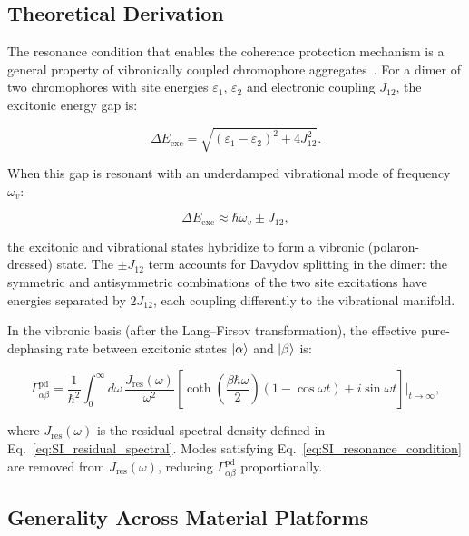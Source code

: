 \documentclass[11pt,a4paper]{article}
\begin{document}
\subsection{Theoretical Derivation}

The resonance condition that enables the coherence protection mechanism is a general property of vibronically coupled chromophore aggregates~\cite{Chin2013,Christensson2012}.
For a dimer of two chromophores with site energies $\varepsilon_1$, $\varepsilon_2$ and electronic coupling $J_{12}$, the excitonic energy gap is:

\begin{equation}
\Delta E_{\mathrm{exc}} = \sqrt{(\varepsilon_1 - \varepsilon_2)^2 + 4J_{12}^2}.
\label{eq:SI_exciton_gap}
\end{equation}

When this gap is resonant with an underdamped vibrational mode of frequency $\omega_v$:

\begin{equation}
\Delta E_{\mathrm{exc}} \approx \hbar\omega_v \pm J_{12},
\label{eq:SI_resonance_condition}
\end{equation}

the excitonic and vibrational states hybridize to form a vibronic (polaron-dressed) state.
The $\pm J_{12}$ term accounts for Davydov splitting in the dimer: the symmetric and antisymmetric combinations of the two site excitations have energies separated by $2J_{12}$, each coupling differently to the vibrational manifold.

In the vibronic basis (after the Lang--Firsov transformation), the effective pure-dephasing rate between excitonic states $\ket{\alpha}$ and $\ket{\beta}$ is:

\begin{equation}
\Gamma_{\alpha\beta}^{\mathrm{pd}} = \frac{1}{\hbar^2} \int_0^\infty d\omega\, \frac{J_{\mathrm{res}}(\omega)}{\omega^2} \left[\coth\!\left(\frac{\beta\hbar\omega}{2}\right)(1 - \cos\omega t) + i\sin\omega t\right]\bigg|_{t\to\infty},
\label{eq:SI_dephasing_rate}
\end{equation}

where $J_{\mathrm{res}}(\omega)$ is the residual spectral density defined in Eq.~\ref{eq:SI_residual_spectral}.
Modes satisfying Eq.~\ref{eq:SI_resonance_condition} are removed from $J_{\mathrm{res}}(\omega)$, reducing $\Gamma_{\alpha\beta}^{\mathrm{pd}}$ proportionally.

\subsection{Generality Across Material Platforms}
\end{document}
